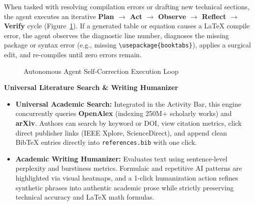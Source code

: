 \documentclass[12pt,a4paper,twoside]{article}
\newcommand{\subhead}[2]{%
  \begingroup\setlength{\parskip}{0pt}\vspace{10pt}%
  \noindent\hspace*{0.25in}\makebox[0.35in][l]{\fontsize{13pt}{15.6pt}\selectfont\bfseries #1}%
  {\fontsize{13pt}{15.6pt}\selectfont\bfseries #2}\par\nopagebreak
  \vspace{4pt}
  \endgroup}
\newcommand{\subsubhead}[1]{%
  \begingroup\setlength{\parskip}{0pt}\vspace{8pt}%
  \noindent\hspace*{0.25in}{\fontsize{12pt}{14.4pt}\selectfont\bfseries\itshape #1}\par\nopagebreak
  \vspace{3pt}
  \endgroup}
\newcommand{\code}[1]{\texttt{#1}}
\begin{document}
\subsubhead{Automated Self-Correction Loop}
When tasked with resolving compilation errors or drafting new technical sections, the agent executes an iterative \textbf{Plan $\to$ Act $\to$ Observe $\to$ Reflect $\to$ Verify} cycle (Figure~\ref{fig:agent_loop}). If a generated table or equation causes a \LaTeX{} compile error, the agent observes the diagnostic line number, diagnoses the missing package or syntax error (e.g., missing \code{\textbackslash usepackage\{booktabs\}}), applies a surgical edit, and re-compiles until zero errors remain.

\begin{figure}[htbp]
\centering
{}
\caption{Autonomous Agent Self-Correction Execution Loop}
\label{fig:agent_loop}
\end{figure}

\subhead{4.4}{Universal Literature Search \& Writing Humanizer}
\begin{itemize}[leftmargin=0.4in,itemsep=2pt,topsep=2pt,parsep=0pt]
    \item \textbf{Universal Academic Search:} Integrated in the Activity Bar, this engine concurrently queries \textbf{OpenAlex} (indexing 250M+ scholarly works) and \textbf{arXiv}. Authors can search by keyword or DOI, view citation metrics, click direct publisher links (IEEE Xplore, ScienceDirect), and append clean Bib\TeX{} entries directly into \code{references.bib} with one click.
    \item \textbf{Academic Writing Humanizer:} Evaluates text using sentence-level perplexity and burstiness metrics. Formulaic and repetitive AI patterns are highlighted via visual heatmaps, and a 1-click humanization action refines synthetic phrases into authentic academic prose while strictly preserving technical accuracy and \LaTeX{} math formulas.
\end{itemize}
\end{document}

